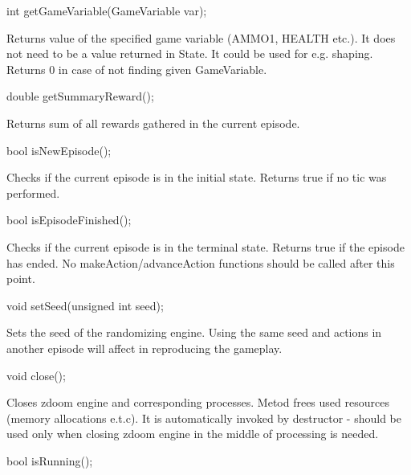 \vspace{20pt}
\begin{clinee}
	int getGameVariable(GameVariable var);
\end{clinee}

Returns value of the specified game variable (AMMO1, HEALTH etc.). It does not need to be a value returned in State.
It could be used for e.g. shaping. Returns 0 in case of not finding given GameVariable.


\vspace{20pt}
\begin{clinee}
	double getSummaryReward();
\end{clinee}

Returns sum of all rewards gathered in the current episode.


\vspace{20pt}
\begin{clinee}
	bool isNewEpisode();
\end{clinee}

Checks if the current episode is in the initial state. Returns true if no tic was performed.


\vspace{20pt}
\begin{clinee}
	bool isEpisodeFinished();
\end{clinee}

Checks if the current episode is in the terminal state. Returns true if the episode has ended. No makeAction/advanceAction functions should be called after this point.


\vspace{20pt}
\begin{clinee}
	void setSeed(unsigned int seed);
\end{clinee}

Sets the seed of the randomizing engine. Using the same seed and actions in another episode will affect in reproducing the gameplay.


\vspace{20pt}
\begin{clinee}
	void close();
\end{clinee}

Closes zdoom engine and corresponding processes. Metod frees used resources (memory allocations e.t.c). It is automatically invoked by destructor - should be used only when closing zdoom engine in the middle of processing is needed.


\vspace{20pt}
\begin{clinee}
	bool isRunning();
\end{clinee}

